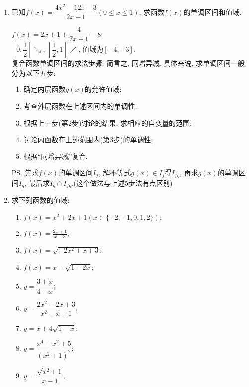 \begin{enumerate}
\item 已知$f(x)=\dfrac{4x^2-12x-3}{2x+1}(0\leq x\leq 1)$, 求函数$f(x)$的单调区间和值域. 
\begin{jieda}
$f(x)=2x+1+\dfrac{4}{2x+1}-8$. \\
$\left[0,\dfrac{1}{2}\right]\searrow$, $\left[\dfrac{1}{2},1\right]\nearrow$, 值域为$[-4,-3]$. \\
复合函数单调区间的求法步骤: 
简言之, 同增异减. 具体来说, 求单调区间一般分为以下五步: 
\begin{enumerate}[leftmargin=1.5cm,label=第\arabic{enumii}步:]
\item 确定内层函数$g(x)$的允许值域;
\item 考查外层函数在上述区间内的单调性;
\item 根据上一步(第2步)讨论的结果, 求相应的自变量的范围;
\item 讨论内函数在上述范围内(第3步)的单调性;
\item 根据``同增异减''复合.
\end{enumerate}
\ps 先求$f(x)$的单调区间$I_f$, 解不等式$g(x)\in I_f$得$I_{fg}$, 再求$g(x)$的单调区间$I_g$, 最后求$I_g\cap I_{fg}$.(这个做法与上述5步法有点区别)
\end{jieda}
\begin{vspace_}
\vsp[5]
\end{vspace_}

\item 求下列函数的值域:
\begin{enumerate}
\item $f(x)=x^2+2 x+1(x \in\{-2,-1,0,1,2\})$; 
\item $f(x)=\frac{2 x+1}{x-3}$; 
\item $f(x)=\sqrt{-2x^2+x+3}$; 
\item $f(x)=x-\sqrt{1-2x}$; 
\item $y=\dfrac{3+x}{4-x}$; 
\item $y=\dfrac{2x^2-2x+3}{x^2-x+1}$; 
\item $y=x+4\sqrt{1-x}$; 
\item $y=\dfrac{x^4+x^2+5}{(x^2+1)^2}$; 
\item $y=\dfrac{\sqrt{x^2+1}}{x-1}$. 
\end{enumerate}


\end{enumerate}
